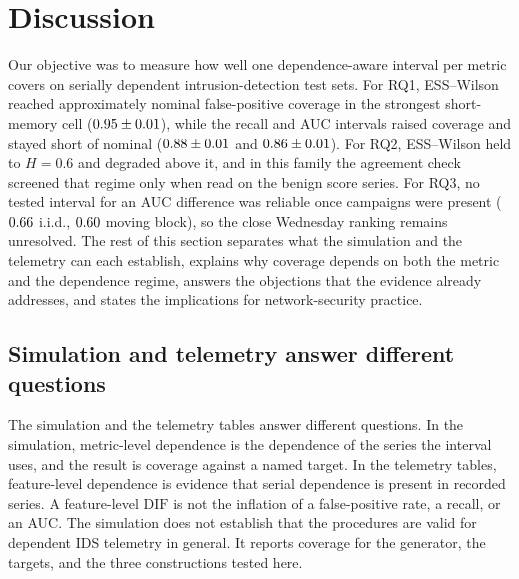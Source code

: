 \documentclass[a4paper,fleqn]{cas-dc}
\newcommand{\DIF}{\mathrm{DIF}}
\begin{document}
\FloatBarrier
\section{Discussion}
Our objective was to measure how well one dependence-aware interval per metric covers on serially
dependent intrusion-detection test sets. For RQ1, ESS--Wilson reached approximately nominal
false-positive coverage in the strongest short-memory cell ($0.95\pm0.01$), while the recall and AUC
intervals raised coverage and stayed short of nominal ($0.88\pm0.01$ and $0.86\pm0.01$). For RQ2,
ESS--Wilson held to $H{=}0.6$ and degraded above it, and in this family the agreement check screened
that regime only when read on the benign score series. For RQ3, no tested interval for an AUC
difference was reliable once campaigns were present ($0.66$ i.i.d., $0.60$ moving
block), so the close Wednesday ranking remains unresolved. The rest of this section separates what
the simulation and the telemetry can each establish, explains why coverage depends on both the
metric and the dependence regime, answers the objections that the evidence already addresses, and
states the implications for network-security practice.
\subsection{Simulation and telemetry answer different questions}
The simulation and the telemetry tables answer different questions. In the simulation, metric-level
dependence is the dependence of the series the interval uses, and the result is coverage against a
named target. In the telemetry tables, feature-level dependence is evidence that serial dependence
is present in recorded series. A feature-level $\DIF$ is not the inflation of a false-positive
rate, a recall, or an AUC. The simulation does not establish that the procedures are valid for
dependent IDS telemetry in general. It reports coverage for the generator, the targets, and the
three constructions tested here.
\end{document}
